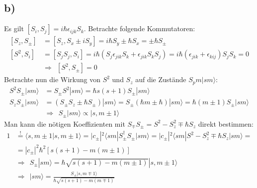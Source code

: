 \documentclass[a4paper,12pt]{article}
\newcommand{\braket}{}
\newcommand{\kla}{}
\newcommand{\klam}{}
\newcommand{\Ket}{}
\begin{document}
\subsection*{b)}
Es gilt $\klam\left[ {S_i,S_j} \right]=i\hbar\epsilon_{ijk}S_k$. Betrachte folgende Kommutatoren:
\begin{align*}
\klam\left[ {S_z,S_\pm} \right]&=\klam\left[ {S_z,S_x\pm iS_y} \right]=i\hbar S_y\pm\hbar S_x=\pm\hbar S_\pm \\
\klam\left[ {S^2,S_i} \right]&=\klam\left[ {S_jS_j,S_i} \right]=i\hbar\kla\left( {S_j\epsilon_{jik}S_k+\epsilon_{jik}S_kS_j} \right)=i\hbar\kla\left( {\epsilon_{jik}+\epsilon_{kij}} \right) S_jS_k=0\\
&\Rightarrow\ \ \klam\left[ {S^2,S_\pm} \right]=0
\end{align*}
Betrachte nun die Wirkung von $S^2$ und $S_z$ auf die Zustände $S_pm\Ket | {sm} \rangle$:
\begin{align*}
S^2S_\pm\Ket | {sm} \rangle&=S_\pm S^2\Ket | {sm} \rangle=\hbar s(s+1)S_\pm\Ket | {sm} \rangle \\
S_zS_\pm\Ket | {sm} \rangle&=\kla\left( {S_\pm S_z\pm\hbar S_\pm} \right)\Ket | {sm} \rangle=S_\pm\kla\left( {\hbar m\pm\hbar} \right)\Ket | {sm} \rangle=\hbar\kla\left( {m\pm 1} \right)S_\pm\Ket | {sm} \rangle \\
&\Rightarrow\ \ S_\pm\Ket | {sm} \rangle\propto\Ket | {s,m\pm 1} \rangle
\end{align*}
Man kann die nötigen Koeffizienten mit $S_\mp S_\pm=S^2-S_z^2\mp\hbar S_z$ direkt bestimmen:
\begin{align*}
1&\overset{!}{=}\braket\langle {s,m\pm 1} | {s,m\pm 1}\rangle=|c_\pm|^2\braket\langle {sm} | {S_\pm^\dagger S_\pm} | {sm}\rangle=|c_\pm|^2\braket\langle {sm} | {S^2-S_z^2\mp\hbar S_z} | {sm}\rangle=\\
&=|c_\pm|^2\hbar^2\kla\left[ {s(s+1)-m(m\pm 1)} \right] \\
&\Rightarrow\ \ S_\pm\Ket | {sm} \rangle=\hbar\sqrt{s(s+1)-m(m\pm 1)}\Ket | {s,m\pm 1} \rangle\\
&\Rightarrow\ \ \Ket | {sm} \rangle=\frac{S_\pm\Ket | {s,m\mp 1} \rangle}{\hbar\sqrt{s(s+1)-m(m\mp 1)}}
\end{align*}
\end{document}
